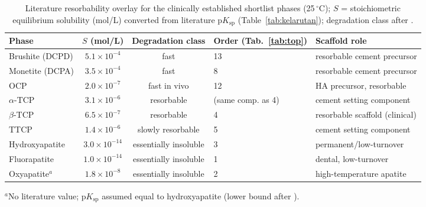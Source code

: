 \documentclass[review,11pt,a4paper]{elsarticle}
\begin{document}
\begin{table}[ht]
\centering\small
\caption{Literature resorbability overlay for the clinically established shortlist phases (25\,$^\circ$C); $S$ = stoichiometric equilibrium solubility (mol/L) converted from literature p$K_\mathrm{sp}$ (Table~\ref{tab:kelarutan}); degradation class after \cite{dorozhkin2009}.}
\label{tab:resorb}
\begin{tabular}{lccll}
\toprule
Phase & $S$ (mol/L) & Degradation class & Order (Tab.~\ref{tab:top}) & Scaffold role \\
\midrule
Brushite (DCPD) & $5.1\times10^{-4}$ & fast & 13 & resorbable cement precursor \\
Monetite (DCPA) & $3.5\times10^{-4}$ & fast & 8 & resorbable cement precursor \\
OCP & $2.0\times10^{-7}$ & fast in vivo & 12 & HA precursor, resorbable \\
$\alpha$-TCP & $3.1\times10^{-6}$ & resorbable & (same comp. as 4) & cement setting component \\
$\beta$-TCP & $6.5\times10^{-7}$ & resorbable & 4 & resorbable scaffold (clinical) \\
TTCP & $1.4\times10^{-6}$ & slowly resorbable & 5 & cement setting component \\
Hydroxyapatite & $3.0\times10^{-14}$ & essentially insoluble & 3 & permanent/low-turnover \\
Fluorapatite & $1.0\times10^{-14}$ & essentially insoluble & 1 & dental, low-turnover \\
Oxyapatite$^{a}$ & $1.8\times10^{-8}$ & essentially insoluble & 2 & high-temperature apatite \\
\bottomrule
\end{tabular}
\vspace{2pt}\footnotesize $^{a}$No literature value; p$K_\mathrm{sp}$ assumed equal to hydroxyapatite (lower bound after \cite{elliott1994}).
\end{table}
\end{document}

